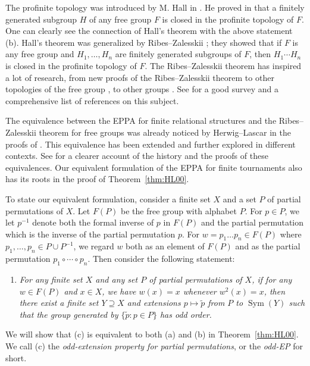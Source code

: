 \documentclass[11pt]{amsart}
\theoremstyle{definition}
\theoremstyle{definition}
\numberwithin{equation}{section}
\begin{document}
The profinite topology was introduced by M. Hall in \cite{Ha49, Ha50}. He proved in \cite[Theorem 5.1]{Ha49} that a finitely generated subgroup $H$ of any free group $F$ is closed in the profinite topology of $F$. One can clearly see the connection of Hall's theorem with the above statement (b). Hall's theorem was generalized by Ribes--Zalesskii \cite{RZ93}; they showed that if $F$ is any free group and $H_1, \dots, H_n$ are finitely generated subgroups of $F$, then $H_1\cdots H_n$ is closed in the profinite topology of $F$. The Ribes--Zalesskii theorem has inspired a lot of research, from new proofs of the Ribes--Zalesskii theorem \cite{AS05, Zh25} to other topologies of the free group \cite{RZ94, AS04, Au17}, to other groups \cite{Yo97, Co01, Mi06,  RZBook, Ro11, MS24, MM25}. See \cite{ABO26} for a good survey and a comprehensive list of references on this subject.

The equivalence between the EPPA for finite relational structures and the Ribes--Zalesskii theorem for free groups was already noticed by Herwig--Lascar in the proofs of \cite{HL00}. This equivalence has been extended and further explored in different contexts. See \cite{ABO26} for a clearer account of the history and the proofs of these equivalences. Our equivalent formulation of the EPPA for finite tournaments also has its roots in the proof of Theorem~\ref{thm:HL00}.

To state our equivalent formulation, consider a finite set $X$ and a set $P$ of partial permutations of $X$. Let $F(P)$ be the free group with alphabet $P$. For $p\in P$, we let $p^{-1}$ denote both the formal inverse of $p$ in $F(P)$ and the partial permutation which is the inverse of the partial permutation $p$. For $w=p_1\dots p_n\in F(P)$ where $p_1,\dots, p_n\in P\cup P^{-1}$, we regard $w$ both as an element of $F(P)$ and as the partial permutation $p_1\circ\cdots\circ p_n$. Then consider the following statement:
\begin{enumerate}
\item[(c)] \emph{For any finite set $X$ and any set $P$ of partial permutations of $X$, if for any $w\in F(P)$ and $x\in X$, we have $w(x)=x$ whenever $w^2(x)=x$, then there exist a finite set $Y\supseteq X$ and extensions $p\mapsto \tilde{p}$ from $P$ to $\operatorname{Sym}(Y)$ such that the group generated by $\{\tilde{p}\colon p\in P\}$ has odd order. }
\end{enumerate}
We will show that (c) is equivalent to both (a) and (b) in Theorem~\ref{thm:HL00}. We call (c) the \emph{odd-extension property for partial permutations}, or the \emph{odd-EP} for short.
\end{document}
